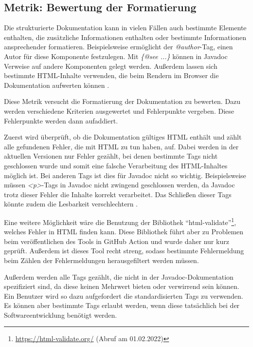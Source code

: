  \subsection{Metrik: Bewertung der Formatierung}\label{chapter:metric_formatting}
 
Die strukturierte Dokumentation kann in vielen Fällen auch bestimmte Elemente enthalten, die zusätzliche Informationen enthalten oder bestimmte Informationen ansprechender formatieren. Beispielsweise ermöglicht der \textit{@author}-Tag, einen Autor für diese Komponente festzulegen. Mit \textit{\{@see ...\}} können in Javadoc Verweise auf andere Komponenten gelegt werden. Außerdem lassen sich bestimmte \ac{HTML}-Inhalte verwenden, die beim Rendern im Browser die Dokumentation aufwerten können \cite{HowtoWriteDocCommentsfortheJavadocTool}. 

Diese Metrik versucht die Formatierung der Dokumentation zu bewerten. Dazu werden verschiedene Kriterien ausgewertet und Fehlerpunkte vergeben. Diese Fehlerpunkte werden dann aufaddiert. 

Zuerst wird überprüft, ob die Dokumentation gültiges \ac{HTML} enthält und zählt alle gefundenen Fehler, die mit HTML zu tun haben, auf.  Dabei werden in der aktuellen Versionen nur Fehler gezählt, bei denen bestimmte Tags nicht geschlossen wurde und somit eine falsche Verarbeitung des HTML-Inhaltes möglich ist. Bei anderen Tags ist dies für Javadoc nicht so wichtig. Beispielsweise müssen \textit{<p>}-Tags in Javadoc nicht zwingend geschlossen werden, da Javadoc trotz dieser Fehler die Inhalte korrekt verarbeitet. Das Schließen dieser Tags könnte zudem die Lesbarkeit verschlechtern  \cite{javadoc_coding_standards}.

Eine weitere Möglichkeit wäre die Benutzung der Bibliothek \enquote{html-validate}\footnote{\href{HTML-Validate}{https://html-validate.org/} (Abruf am 01.02.2022)}, welches Fehler in \ac{HTML} finden kann. Diese Bibliothek führt aber zu Problemen beim veröffentlichen des Tools in GitHub Action und wurde daher nur kurz geprüft. Außerdem ist dieses Tool recht streng, sodass bestimmte Fehlermeldung beim Zählen der Fehlermeldungen herausgefiltert werden müssen. 

Außerdem werden alle Tags gezählt, die nicht in der Javadoc-Dokumentation spezifiziert sind, da diese keinen Mehrwert  bieten oder verwirrend sein können. Ein Benutzer wird so dazu aufgefordert die standardisierten Tags zu verwenden. Es können aber bestimmte Tags erlaubt werden, wenn diese tatsächlich bei der Softwareentwicklung benötigt werden.


